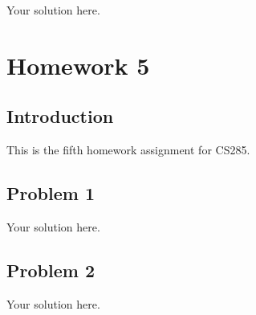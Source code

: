 \documentclass[12pt,oneside]{book}
\begin{document}
Your solution here.

\chapter{Homework 5}

\section{Introduction}

This is the fifth homework assignment for CS285.

\section{Problem 1}

Your solution here.

\section{Problem 2}

Your solution here.
\end{document}
